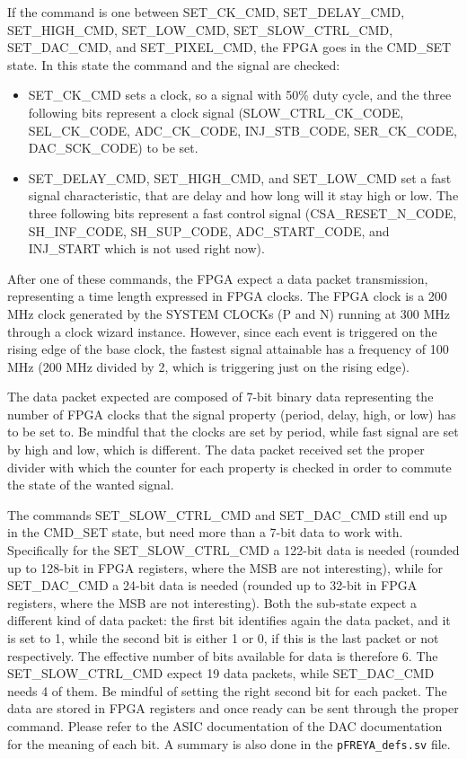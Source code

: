 \documentclass[a4paper,twoside]{article}
\begin{document}
	If the command is one between SET\_CK\_CMD, SET\_DELAY\_CMD, SET\_HIGH\_CMD, SET\_LOW\_CMD, SET\_SLOW\_CTRL\_CMD, SET\_DAC\_CMD, and SET\_PIXEL\_CMD, the FPGA goes in the CMD\_SET state. In this state the command and the signal are checked:
	\begin{itemize}
		\item SET\_CK\_CMD sets a clock, so a signal with 50\% duty cycle, and the three following bits represent a clock signal (SLOW\_CTRL\_CK\_CODE, SEL\_CK\_CODE, ADC\_CK\_CODE, INJ\_STB\_CODE, SER\_CK\_CODE, DAC\_SCK\_CODE) to be set.
		\item SET\_DELAY\_CMD, SET\_HIGH\_CMD, and SET\_LOW\_CMD set a fast signal characteristic, that are delay and how long will it stay high or low. The three following bits represent a fast control signal (CSA\_RESET\_N\_CODE, SH\_INF\_CODE, SH\_SUP\_CODE, ADC\_START\_CODE, and INJ\_START which is not used right now).
	\end{itemize}

	After one of these commands, the FPGA expect a data packet transmission, representing a time length expressed in FPGA clocks. The FPGA clock is a 200 MHz clock generated by the SYSTEM CLOCKs (P and N) running at 300 MHz through a clock wizard instance. However, since each event is triggered on the rising edge of the base clock, the fastest signal attainable has a frequency of 100 MHz (200 MHz divided by 2, which is triggering just on the rising edge).

	The data packet expected are composed of 7-bit binary data representing the number of FPGA clocks that the signal property (period, delay, high, or low) has to be set to. Be mindful that the clocks are set by period, while fast signal are set by high and low, which is different. The data packet received set the proper divider with which the counter for each property is checked in order to commute the state of the wanted signal.

	The commands SET\_SLOW\_CTRL\_CMD and SET\_DAC\_CMD still end up in the CMD\_SET state, but need more than a 7-bit data to work with. Specifically for the SET\_SLOW\_CTRL\_CMD a 122-bit data is needed (rounded up to 128-bit in FPGA registers, where the MSB are not interesting), while for SET\_DAC\_CMD a 24-bit data is needed (rounded up to 32-bit in FPGA registers, where the MSB are not interesting). Both the sub-state expect a different kind of data packet: the first bit identifies again the data packet, and it is set to 1, while the second bit is either 1 or 0, if this is the last packet or not respectively. The effective number of bits available for data is therefore 6. The SET\_SLOW\_CTRL\_CMD expect 19 data packets, while SET\_DAC\_CMD needs 4 of them. Be mindful of setting the right second bit for each packet. The data are stored in FPGA registers and once ready can be sent through the proper command. Please refer to the ASIC documentation of the DAC documentation for the meaning of each bit. A summary is also done in the \texttt{pFREYA\_defs.sv} file.
\end{document}
